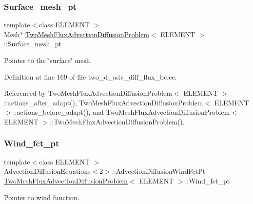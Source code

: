 \subsubsection{\texorpdfstring{Surface\+\_\+mesh\+\_\+pt}{Surface\_mesh\_pt}}
{\footnotesize\ttfamily template$<$class E\+L\+E\+M\+E\+NT $>$ \\
Mesh$\ast$ \hyperlink{classTwoMeshFluxAdvectionDiffusionProblem}{Two\+Mesh\+Flux\+Advection\+Diffusion\+Problem}$<$ E\+L\+E\+M\+E\+NT $>$\+::Surface\+\_\+mesh\+\_\+pt\hspace{0.3cm}{\ttfamily [private]}}



Pointer to the \char`\"{}surface\char`\"{} mesh. 



Definition at line 169 of file two\+\_\+d\+\_\+adv\+\_\+diff\+\_\+flux\+\_\+bc.\+cc.



Referenced by Two\+Mesh\+Flux\+Advection\+Diffusion\+Problem$<$ E\+L\+E\+M\+E\+N\+T $>$\+::actions\+\_\+after\+\_\+adapt(), Two\+Mesh\+Flux\+Advection\+Diffusion\+Problem$<$ E\+L\+E\+M\+E\+N\+T $>$\+::actions\+\_\+before\+\_\+adapt(), and Two\+Mesh\+Flux\+Advection\+Diffusion\+Problem$<$ E\+L\+E\+M\+E\+N\+T $>$\+::\+Two\+Mesh\+Flux\+Advection\+Diffusion\+Problem().

\mbox{\label{classTwoMeshFluxAdvectionDiffusionProblem_acec16e75f69f21f927dd6a4671cd64ea}} 
\subsubsection{\texorpdfstring{Wind\+\_\+fct\+\_\+pt}{Wind\_fct\_pt}}
{\footnotesize\ttfamily template$<$class E\+L\+E\+M\+E\+NT $>$ \\
Advection\+Diffusion\+Equations$<$2$>$\+::Advection\+Diffusion\+Wind\+Fct\+Pt \hyperlink{classTwoMeshFluxAdvectionDiffusionProblem}{Two\+Mesh\+Flux\+Advection\+Diffusion\+Problem}$<$ E\+L\+E\+M\+E\+NT $>$\+::Wind\+\_\+fct\+\_\+pt\hspace{0.3cm}{\ttfamily [private]}}



Pointer to wind function. 



